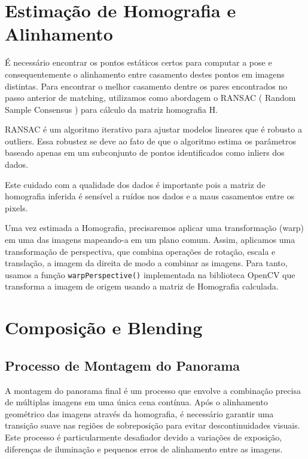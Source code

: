 \documentclass[12pt]{article}
\begin{document}
\section{Estimação de Homografia e Alinhamento}

É necessário encontrar os pontos estáticos certos para computar a pose e consequentemente o alinhamento entre casamento destes pontos em imagens distintas. Para encontrar o melhor casamento dentre os pares encontrados no passo anterior de matching, utilizamos como abordagem o RANSAC ( Random Sample Consensus ) para cálculo da matriz homografia H.

RANSAC é um algoritmo iterativo para ajustar modelos lineares que é robusto a outliers. Essa robustez se deve ao fato de que o algoritmo estima os parâmetros baseado apenas em um subconjunto de pontos identificados como inliers dos dados.

Este cuidado com a qualidade dos dados é importante pois a matriz de homografia inferida é sensível a ruídos nos dados e a maus casamentos entre os pixels.

Uma vez estimada a Homografia, precisaremos aplicar uma transformação (warp) em uma das imagens mapeando-a em um plano comum. Assim, aplicamos uma transformação de perspectiva, que combina operações de rotação, escala e translação, a {imagem da direita} de modo a combinar as imagens. Para tanto, usamos a função \texttt{warpPerspective()} implementada na biblioteca OpenCV que transforma a imagem de origem usando a matriz de Homografia calculada. 

\section{Composição e Blending}

\subsection{Processo de Montagem do Panorama}
A montagem do panorama final é um processo que envolve a combinação precisa de múltiplas imagens em uma única cena contínua. Após o alinhamento geométrico das imagens através da homografia, é necessário garantir uma transição suave nas regiões de sobreposição para evitar descontinuidades visuais. Este processo é particularmente desafiador devido a variações de exposição, diferenças de iluminação e pequenos erros de alinhamento entre as imagens.
\end{document}
